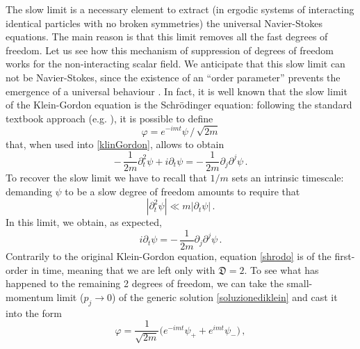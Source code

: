\documentclass[a4paper, amsfonts, amssymb, amsmath, reprint, twocolumn, showkeys, nofootinbib]{revtex4-2}
\begin{document}
The slow limit is a necessary element to extract (in ergodic systems of interacting identical particles with no broken symmetries) the universal Navier-Stokes equations. The main reason is that this limit removes all the fast degrees of freedom. Let us see how this mechanism of suppression of degrees of freedom works for the non-interacting scalar field. We anticipate that this slow limit can not be Navier-Stokes, since the existence of an ``order parameter'' prevents the emergence of a universal behaviour \cite{ruffini69}. 
In fact, it is well known that the slow limit of the Klein-Gordon equation is the Schr\"{o}dinger equation: following the standard textbook approach (e.g. \citep{Zee2003}), it is possible to define  
\begin{equation}\label{wave}
\varphi =  e^{-imt} \psi \, / \, \sqrt{2m} 
\end{equation}
that, when used into \eqref{klinGordon}, allows to obtain
\begin{equation}\label{KKgor}
- \, \dfrac{1}{2m} \partial_t^2 \psi +i  \partial_t \psi = - \, \dfrac{1}{2m} \partial_j \partial^j \psi \, .
\end{equation}
To recover the slow limit we have to recall that $1/m$ sets an intrinsic timescale: demanding $\psi$ to be  a slow degree of freedom amounts to require that
\begin{equation}\label{chain}
|\partial_t^2 \psi| \ll m|\partial_t \psi| \, .
\end{equation}
In this limit, we obtain, as expected,
\begin{equation}\label{shrodo}
i  \partial_t \psi = - \, \dfrac{1}{2m} \partial_j \partial^j \psi \, .
\end{equation}
%
Contrarily to the original Klein-Gordon equation, equation \eqref{shrodo} is of the first-order in time, meaning that we are left only with $\mathfrak{D}=2$. To see what has happened to the remaining 2 degrees of freedom, we can take the small-momentum limit ($p_j \longrightarrow 0$) of the generic solution \eqref{soluzionediklein} and cast it into the form
\begin{equation}\label{2wave}
\varphi =\dfrac{1}{\sqrt{2m}} \big( e^{-imt} \psi_+ + e^{imt} \psi_- \big) \, ,
\end{equation}
\end{document}
